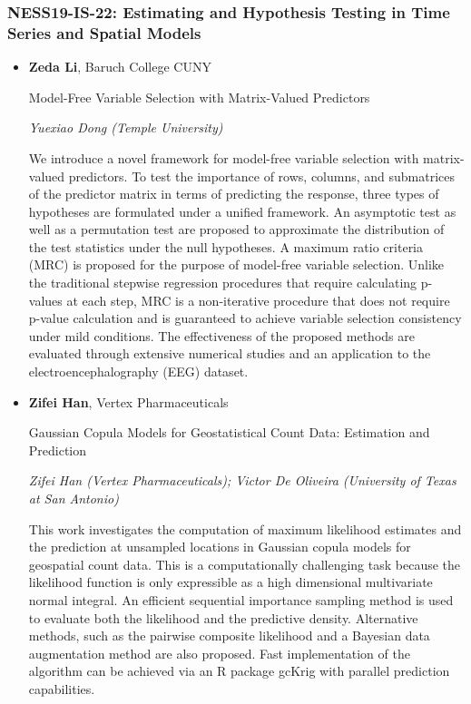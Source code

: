 \begin{itemize}
\end{itemize}

\subsubsection*{NESS19-IS-22: Estimating and Hypothesis Testing in Time Series and Spatial Models}

\begin{itemize}
\item \textbf{Zeda Li}, Baruch College CUNY

Model-Free Variable Selection with Matrix-Valued Predictors

\emph{\footnotesize Yuexiao Dong (Temple University)}

We introduce a novel framework for model-free variable selection with matrix-valued predictors. To test the importance of rows, columns, and submatrices of the predictor matrix in terms of predicting the response, three types of hypotheses are formulated under a unified framework. An asymptotic test as well as a permutation test are proposed to approximate the distribution of the test statistics under the null hypotheses. A maximum ratio criteria (MRC) is proposed for the purpose of model-free variable selection. Unlike the traditional stepwise regression procedures that require calculating p-values at each step, MRC is a non-iterative procedure that does not require p-value calculation and is guaranteed to achieve variable selection consistency under mild conditions. The effectiveness of the proposed methods are evaluated through extensive numerical studies and an application to the electroencephalography (EEG) dataset.

\item \textbf{Zifei Han}, Vertex Pharmaceuticals

Gaussian Copula Models for Geostatistical Count Data: Estimation and Prediction

\emph{\footnotesize Zifei Han (Vertex Pharmaceuticals); Victor De Oliveira (University of Texas at San Antonio)}

This work investigates the computation of maximum likelihood estimates and the prediction at unsampled locations in Gaussian copula models for geospatial count data. This is a computationally challenging task because the likelihood function is only expressible as a high dimensional multivariate normal integral. An efficient sequential importance sampling method is used to evaluate both the likelihood and the predictive density. Alternative methods, such as the pairwise composite likelihood and a Bayesian data augmentation method are also proposed. Fast implementation of the algorithm can be achieved via an R package gcKrig with parallel prediction capabilities.


\end{itemize}
